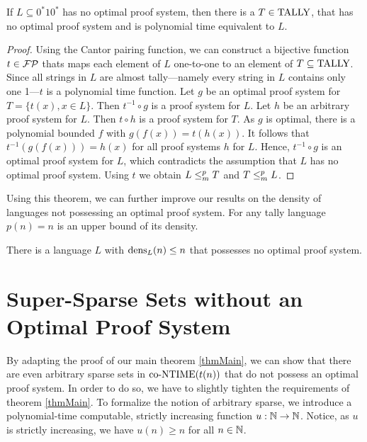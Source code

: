   \begin{theorem} \label{thmTally}
    If \(L \subseteq 0^*10^* \) has no optimal proof system, then there is a \(T \in \text{TALLY}\), that has no optimal proof system and is polynomial time equivalent to \(L\).
  \end{theorem}

  \begin{proof}
    Using the Cantor pairing function, we can construct a bijective function \(t \in \mathcal{FP}\) thats maps each element of \(L\) one-to-one to an element of \(T \subseteq \text{TALLY}\). Since all strings in \(L\) are almost tally---namely every string in \(L\) contains only one 1---\(t\) is a polynomial time function. Let \(g\) be an optimal proof system for \(T = \{ t(x), x \in L \}\). Then \(t^{-1} \circ g\) is a proof system for \(L\). Let \(h\) be an arbitrary proof system for \(L\). Then \(t \circ h\) is a proof system for \(T\). As \(g\) is optimal, there is a polynomial bounded \(f\) with \(g(f(x)) = t(h(x))\). It follows that \(t^{-1}(g(f(x))) = h(x)\) for all proof systems \(h\) for \(L\). Hence, \(t^{-1} \circ g\) is an optimal proof system for \(L\), which contradicts the assumption that \(L\) has no optimal proof system. Using \(t\) we obtain \(L \leq_{m}^{p} T\) and \(T \leq_{m}^{p} L\).
  \end{proof}
  
  Using this theorem, we can further improve our results on the density of languages not possessing an optimal proof system. For any tally language \(p(n) = n\) is an upper bound of its density.

  \begin{corollary}
    There is a language \(L\) with \(\operatorname{dens}_L(n) \leq n\) that possesses no optimal proof system.
  \end{corollary}

  \section{Super-Sparse Sets without an Optimal Proof System}

  By adapting the proof of our main theorem \ref{thmMain}, we can show that there are even arbitrary sparse sets in \(\text{co-NTIME}(t(n))\) that do not possess an optimal proof system. In order to do so, we have to slightly tighten the requirements of theorem \ref{thmMain}. To formalize the notion of arbitrary sparse, we introduce a polynomial-time computable, strictly increasing function \(u : \mathbb{N} \to \mathbb{N}\). Notice, as \(u\) is strictly increasing, we have \(u(n) \geq n\) for all \(n \in \mathbb{N}\).

